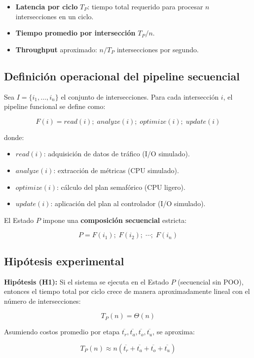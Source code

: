 \documentclass[12pt]{article}
\begin{document}
\begin{itemize}
\item \textbf{Latencia por ciclo} \(T_P\): tiempo total requerido para procesar \(n\) intersecciones en un ciclo.
\item \textbf{Tiempo promedio por intersección} \(T_P/n\).
\item \textbf{Throughput} aproximado: \(n/T_P\) intersecciones por segundo.
\end{itemize}

\subsection{Definición operacional del pipeline secuencial}

Sea \(I=\{i_1,\dots,i_n\}\) el conjunto de intersecciones. Para cada intersección \(i\), el pipeline funcional se
define como:

\[
F(i) = read(i);\; analyze(i);\; optimize(i);\; update(i)
\]

donde:

\begin{itemize}
\item \(read(i)\): adquisición de datos de tráfico (I/O simulado).
\item \(analyze(i)\): extracción de métricas (CPU simulado).
\item \(optimize(i)\): cálculo del plan semafórico (CPU ligero).
\item \(update(i)\): aplicación del plan al controlador (I/O simulado).
\end{itemize}

El Estado \(P\) impone una \textbf{composición secuencial} estricta:

\[
P = F(i_1);\;F(i_2);\;\cdots;\;F(i_n)
\]

\subsection{Hipótesis experimental}

\textbf{Hipótesis (H1):} Si el sistema se ejecuta en el Estado \(P\) (secuencial sin POO), entonces el tiempo total por
ciclo crece de manera aproximadamente lineal con el número de intersecciones:

\[
T_P(n) = \Theta(n)
\]

Asumiendo costos promedio por etapa \(\overline{t_r},\overline{t_a},\overline{t_o},\overline{t_u}\), se aproxima:

\[
T_P(n) \approx n\left(\overline{t_r}+\overline{t_a}+\overline{t_o}+\overline{t_u}\right)
\]
\end{document}
